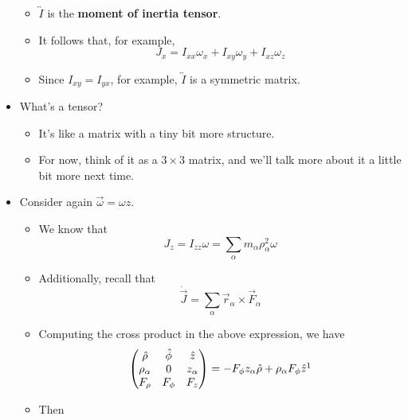\documentclass[../notes.tex]{subfiles}
\begin{document}
\begin{itemize}
\begin{itemize}
        \item $\overleftrightarrow{I}$ is the \textbf{moment of inertia tensor}.
        \item It follows that, for example,
        \begin{equation*}
            J_x = I_{xx}\omega_x+I_{xy}\omega_y+I_{xz}\omega_z
        \end{equation*}
        \item Since $I_{xy}=I_{yx}$, for example, $\overleftrightarrow{I}$ is a symmetric matrix.
    \end{itemize}
    \item What's a tensor?
    \begin{itemize}
        \item It's like a matrix with a tiny bit more structure.
        \item For now, think of it as a $3\times 3$ matrix, and we'll talk more about it a little bit more next time.
    \end{itemize}
    \item Consider again $\vec{\omega}=\omega\hat{z}$.
    \begin{itemize}
        \item We know that
        \begin{equation*}
            J_z = I_{zz}\omega
            = \sum_\alpha m_\alpha\rho_\alpha^2\omega
        \end{equation*}
        \item Additionally, recall that
        \begin{equation*}
            \dot{\vec{J}} = \sum_\alpha\vec{r}_\alpha\times\vec{F}_\alpha
        \end{equation*}
        \item Computing the cross product in the above expression, we have
        \begin{equation*}
            \begin{pmatrix}
                \hat{\rho} & \hat{\phi} & \hat{z}\\
                \rho_\alpha & 0 & z_\alpha\\
                F_\rho & F_\phi & F_z\\
            \end{pmatrix}
            = -F_\phi z_\alpha\hat{\rho}+\rho_\alpha F_\phi\hat{z}\footnotemark
        \end{equation*}
        \item Then

\end{itemize}
\end{itemize}
\end{document}
